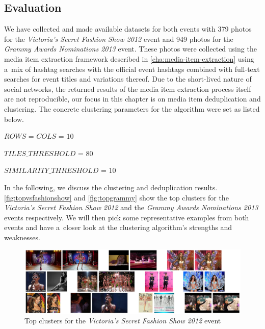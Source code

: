 \subsection{Evaluation}

We have collected and made available 
datasets for both events with
379 photos for the \emph{Victoria's Secret Fashion Show 2012} event 
and 949 photos for the \emph{Grammy Awards Nominations 2013} event.
These photos were collected using the media item extraction framework
described in \autoref{cha:media-item-extraction}
using a~mix of hashtag searches with the official event hashtags combined
with full-text searches for event titles and variations thereof.
Due to the short-lived nature of social networks,
the returned results of the media item extraction process itself
are not reproducible, our focus in this chapter
is on media item deduplication and clustering.
The concrete clustering parameters for the algorithm were set as listed below.

\begin{small_itemize}
  \item[] $ROWS$ = $COLS$ = $10$
  \item[] $TILES\_THRESHOLD$ = $80$
  \item[] $SIMILARITY\_THRESHOLD$ = $10$
\end{small_itemize}

In the following, we discuss the clustering and deduplication results.
\autoref{fig:topvsfashionshow} and \autoref{fig:topgrammy} show the top clusters
for the \emph{Victoria's Secret Fashion Show 2012} and the 
\emph{Grammy Awards Nominations 2013} events respectively.
We will then pick some representative examples from both events
and have a~closer look at the clustering algorithm's strengths and weaknesses.

\begin{figure}[h!]
  \centering
  \includegraphics[width=1.0\linewidth]{./vsfashionshow_clusters.png}
  \caption{Top clusters for the \emph{Victoria's Secret Fashion Show 2012} event}
  \label{fig:topvsfashionshow}
\end{figure}

